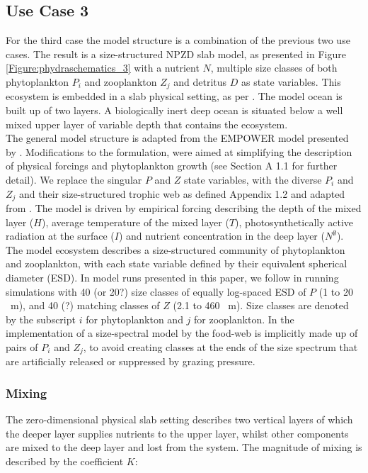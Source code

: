 \documentclass[template.tex]{subfiles}
\begin{document}
\subsection{Use Case 3}
For the third case the model structure is a combination of the previous two use cases. The result is a size-structured NPZD slab model, as presented in Figure \ref{Figure:phydraschematics_3} with a nutrient $N$, multiple size classes of both phytoplankton $P_i$ and zooplankton $Z_j$ and detritus $D$ as state variables.
This ecosystem is embedded in a slab physical setting, as per \citet{Evans1985ACycles}. The model ocean is built up of two layers. A biologically inert deep ocean is situated below a well mixed upper layer of variable depth that contains the ecosystem. \\

The general model structure is adapted from the EMPOWER model presented by \citet{Anderson2015c}. Modifications to the formulation, were aimed at simplifying the description of physical forcings and phytoplankton growth (see Section A 1.1 for further detail). We replace the singular $P$ and $Z$ state variables, with the diverse $P_i$ and $Z_j$ and their size-structured trophic web as defined Appendix 1.2 and adapted from \citet{Banas2011b}. The model is driven by empirical forcing describing the depth of the mixed layer ($H$), average temperature of the mixed layer ($T$), photosynthetically active radiation at the surface ($I$) and nutrient concentration in the deep layer ($N^\emptyset$).\\

The model ecosystem describes a size-structured community of phytoplankton and zooplankton, with each state variable defined by their equivalent spherical diameter (ESD). In model runs presented in this paper, we follow \citet{Banas2011b} in running simulations with 40 (or 20?) size classes of equally log-spaced ESD of $P$ (1 to 20 \unit{\mu m}), and 40 (?)  matching classes of $Z$ (2.1 to 460  \unit{\mu m}). 
Size classes are denoted by the subscript $i$ for phytoplankton and $j$ for zooplankton. In the implementation of a size-spectral model by \citeauthor{Banas2011b} the food-web is implicitly made up of pairs of $P_i$ and $Z_j$, to avoid creating classes at the ends of the size spectrum that are artificially released or suppressed by grazing pressure.



\subsubsection{Mixing}
The zero-dimensional physical slab setting describes two vertical layers of which the deeper layer supplies nutrients to the upper layer, whilst other components are mixed to the deep layer and lost from the system.
The magnitude of mixing is described by the coefficient $K$:
\end{document}
